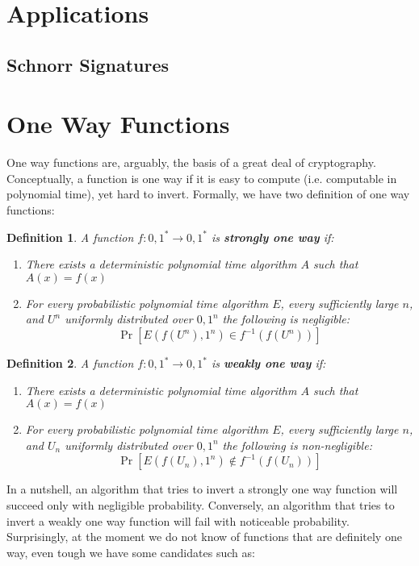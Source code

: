 \documentclass{article}
\newtheorem{definition}{Definition}
\begin{document}
\section{Applications}
\subsection{Schnorr Signatures}

\appendix
\section{One Way Functions}
One way functions are, arguably, the basis of a great deal of cryptography.
Conceptually, a function is one way if it is easy to compute (i.e. computable in polynomial time), yet hard to invert.
Formally, we have two definition of one way functions:
\begin{definition}
    A function $f: {0, 1}^* \to {0, 1}^*$ is \textbf{strongly one way} if:
    \begin{enumerate}
        \item There exists a deterministic polynomial time algorithm $A$ such that $A(x) = f(x)$
        \item For every probabilistic polynomial time algorithm $E$, every sufficiently large $n$, and $U^n$ uniformly distributed over ${0, 1}^n$ the following is negligible:
            \[ \Pr[E(f(U^n), 1^n) \in f^{-1}(f(U^n))  ] \]
    \end{enumerate}
\end{definition}
\begin{definition}
    A function $f: {0, 1}^* \to {0, 1}^*$ is \textbf{weakly one way} if:
    \begin{enumerate}
        \item There exists a deterministic polynomial time algorithm $A$ such that $A(x) = f(x)$
        \item For every probabilistic polynomial time algorithm $E$, every sufficiently large $n$, and $U_n$ uniformly distributed over ${0, 1}^n$ the following is non-negligible:
            \[ \Pr[E(f(U_n), 1^n) \notin f^{-1}(f(U_n))  ] \]
    \end{enumerate}
\end{definition}
In a nutshell, an algorithm that tries to invert a strongly one way function will succeed only with negligible probability.
Conversely, an algorithm that tries to invert a weakly one way function will fail with noticeable probability.
Surprisingly, at the moment we do not know of functions that are definitely one way, even tough we have some candidates such as:
\end{document}
